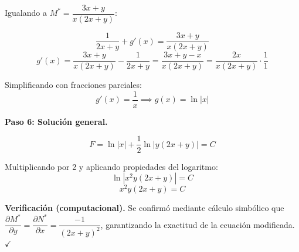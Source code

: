 \begin{respuesta}
Igualando a $M^* = \dfrac{3x+y}{x(2x+y)}$:

\[
    \frac{1}{2x+y} + g'(x) = \frac{3x+y}{x(2x+y)}
\]
\[
    g'(x) = \frac{3x+y}{x(2x+y)} - \frac{1}{2x+y} 
    = \frac{3x+y - x}{x(2x+y)} = \frac{2x}{x(2x+y)} \cdot\frac{1}{1}
\]

Simplificando con fracciones parciales:
\[
    g'(x) = \frac{1}{x} \implies g(x) = \ln|x|
\]

\medskip
\textbf{Paso 6: Solución general.}

\[
    F = \ln|x| + \frac{1}{2}\ln|y(2x+y)| = C
\]

Multiplicando por 2 y aplicando propiedades del logaritmo:
\[
    \ln\left|x^2 y(2x+y)\right| = C
\]
\[
    \boxed{x^2 y(2x+y) = C}
\]

\medskip
\textbf{Verificación (computacional).} Se confirmó mediante 
cálculo simbólico que $\dfrac{\partial M^*}{\partial y} = 
\dfrac{\partial N^*}{\partial x} = \dfrac{-1}{(2x+y)^2}$, 
garantizando la exactitud de la ecuación modificada. $\checkmark$

\end{respuesta}

\newpage




